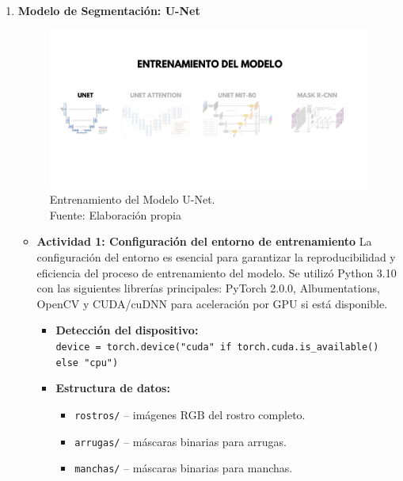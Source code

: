 \begin{enumerate}
  \item \textbf{Modelo de Segmentación: U-Net}
  \begin{figure}[H]
	\begin{center}
		\includegraphics[width=1\textwidth]{4/figures/entrunet.png}
		\caption[Entrenamiento del Modelo U-Net]{Entrenamiento del Modelo U-Net.\\
		Fuente: Elaboración propia}
		\label{4:figentunet}
	\end{center}
\end{figure}
  \begin{itemize}
  \item\textbf{Actividad 1: Configuración del entorno de entrenamiento}
  La configuración del entorno es esencial para garantizar la reproducibilidad y eficiencia del proceso de entrenamiento del modelo. Se utilizó Python 3.10 con las siguientes librerías principales: PyTorch 2.0.0, Albumentations, OpenCV y CUDA/cuDNN para aceleración por GPU si está disponible.

\begin{itemize}
  \item \textbf{Detección del dispositivo:}\\
  \texttt{device = torch.device("cuda" if torch.cuda.is\_available() else "cpu")}
  
  \item \textbf{Estructura de datos:}
  \begin{itemize}
    \item \texttt{rostros/} -- imágenes RGB del rostro completo.
    \item \texttt{arrugas/} -- máscaras binarias para arrugas.
    \item \texttt{manchas/} -- máscaras binarias para manchas.
  \end{itemize}


\end{itemize}
\end{itemize}
\end{enumerate}
